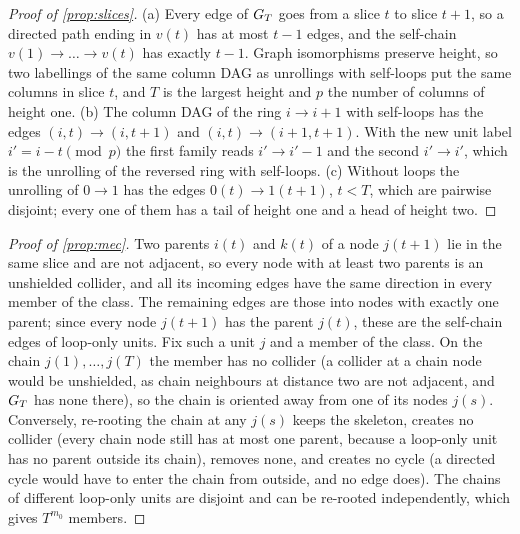 \begin{proof}[Proof of \cref{prop:slices}]
(a) Every edge of $G_T$ goes from a slice $t$ to slice $t+1$, so a directed
path ending in $v(t)$ has at most $t-1$ edges, and the self-chain
$v(1)\to\dots\to v(t)$ has exactly $t-1$. Graph isomorphisms preserve height,
so two labellings of the same column DAG as unrollings with self-loops put the
same columns in slice $t$, and $T$ is the largest height and $p$ the number of
columns of height one.
(b) The column DAG of the ring $i\to i+1$ with self-loops has the edges
$(i,t)\to(i,t{+}1)$ and $(i,t)\to(i{+}1,t{+}1)$. With the new unit label
$i'=i-t \pmod p$ the first family reads $i'\to i'-1$ and the second
$i'\to i'$, which is the unrolling of the reversed ring with self-loops.
(c) Without loops the unrolling of $0\to1$ has the edges $0(t)\to1(t{+}1)$,
$t<T$, which are pairwise disjoint; every one of them has a tail of height one
and a head of height two.
\end{proof}

\begin{proof}[Proof of \cref{prop:mec}]
Two parents $i(t)$ and $k(t)$ of a node $j(t{+}1)$ lie in the same slice and
are not adjacent, so every node with at least two parents is an unshielded
collider, and all its incoming edges have the same direction in every member
of the class. The remaining edges are those into nodes with exactly one
parent; since every node $j(t{+}1)$ has the parent $j(t)$, these are the
self-chain edges of loop-only units. Fix such a unit $j$ and a member of the
class. On the chain $j(1),\dots,j(T)$ the member has no collider (a collider
at a chain node would be unshielded, as chain neighbours at distance two are
not adjacent, and $G_T$ has none there), so the chain is oriented away from
one of its nodes $j(s)$. Conversely, re-rooting the chain at any $j(s)$ keeps
the skeleton, creates no collider (every chain node still has at most one
parent, because a loop-only unit has no parent outside its chain), removes
none, and creates no cycle (a directed cycle would have to enter the chain
from outside, and no edge does). The chains of different loop-only units are
disjoint and can be re-rooted independently, which gives $T^{m_0}$ members.
\end{proof}

